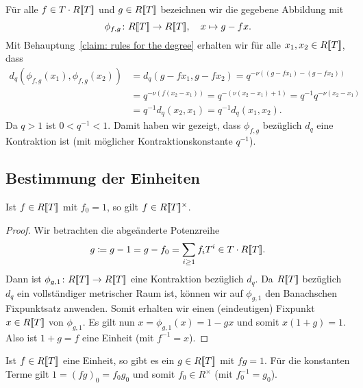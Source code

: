 \documentclass[a4paper, 10pt, numbers=noenddot]{scrartcl}
\begin{document}
Für alle $f \in T \cdot R[\![T]\!]$ und $g \in R[\![T]\!]$ bezeichnen wir die gegebene Abbildung mit
\[
  \phi_{f,g} \colon R[\![T]\!] \to R[\![T]\!],
  \quad
  x \mapsto g - fx.
\]
Mit Behauptung~\ref{claim: rules for the degree} erhalten wir für alle $x_1, x_2 \in R[\![T]\!]$, dass
\begin{align*}
        d_q( \phi_{f,g}(x_1), \phi_{f,g}(x_2) )
  &=    d_q(g - f x_1, g - f x_2)
   =    q^{-\nu((g - f x_1) - (g - f x_2))}
  \\
  &=    q^{-\nu(f (x_2 - x_1))}
   =    q^{-(\nu(x_2 - x_1) + 1)}
   =    q^{-1} q^{-\nu(x_2 - x_1)}
  \\
  &=    q^{-1} d_q(x_2, x_1)
   =    q^{-1} d_q(x_1, x_2).
\end{align*}
Da $q > 1$ ist $0 < q^{-1} < 1$.
Damit haben wir gezeigt, dass $\phi_{f,g}$ bezüglich $d_q$ eine Kontraktion ist (mit möglicher Kontraktionskonstante $q^{-1}$).



\subsection*{Bestimmung der Einheiten}

\begin{claim}
  \label{claim: power series with constant term 1 are units}
  Ist $f \in R[\![T]\!]$ mit $f_0 = 1$, so gilt $f \in R[\![T]\!]^\times$.
\end{claim}
\begin{proof}
  Wir betrachten die abgeänderte Potenzreihe
  \[
              g        
    \coloneqq g - 1
    =         g - f_0
    =         \sum_{i \geq 1} f_i T^i
    \in       T \cdot R[\![T]\!].
  \]
  Dann ist $\phi_{g, 1} \colon R[\![T]\!] \to R[\![T]\!]$ eine Kontraktion bezüglich $d_q$.
  Da $R[\![T]\!]$ bezüglich $d_q$ ein vollständiger metrischer Raum ist, können wir auf $\phi_{g,1}$ den Banachschen Fixpunktsatz anwenden.
  Somit erhalten wir einen (eindeutigen) Fixpunkt $x \in R[\![T]\!]$ von $\phi_{g,1}$.
  Es gilt nun $x = \phi_{g,1}(x) = 1 - g x$ und somit $x (1 + g) = 1$.
  Also ist $1 + g = f$ eine Einheit (mit $f^{-1} = x$).
\end{proof}

Ist $f \in R[\![T]\!]$ eine Einheit, so gibt es ein $g \in R[\![T]\!]$ mit $fg = 1$.
Für die konstanten Terme gilt $1 = (fg)_0 = f_0 g_0$ und somit $f_0 \in R^\times$ (mit $f_0^{-1} = g_0$).
\end{document}
